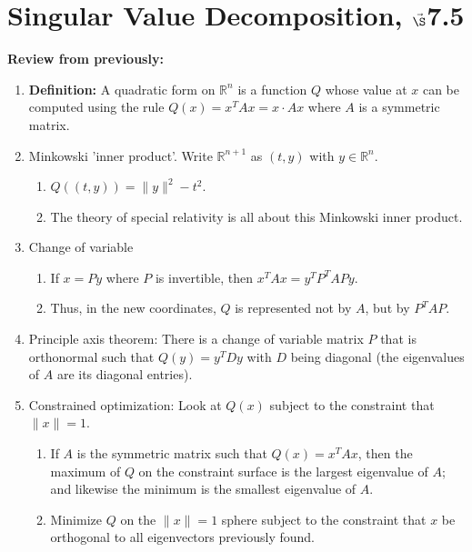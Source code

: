 

%

\section{{Singular Value Decomposition, $\vec\S$7.5}}


%
\thispagestyle{fancy}

\textbf{Review from previously:}
    \begin{enumerate}
    \setlength{\itemsep}{3em}
        \item \textbf{Definition:} A quadratic form on $\mathbb{R}^n$ is a function $Q$ whose value at $x$ can be computed using the rule $Q(x) = x^T A x = x \cdot A x$ where $A$ is a symmetric matrix.
        \item Minkowski 'inner product'. Write $\mathbb{R}^{n+1}$ as $(t, y)$ with $y \in \mathbb{R}^n$.
        \begin{enumerate}
            \item $Q((t, y)) = \|y\|^2 - t^2$.
            \item The theory of special relativity is all about this Minkowski inner product.
        \end{enumerate}
        \item Change of variable
        \begin{enumerate}
            \item If $x = Py$ where $P$ is invertible, then $x^T A x = y^T P^T A P y$.
            \item Thus, in the new coordinates, $Q$ is represented not by $A$, but by $P^T A P$.
        \end{enumerate}
        \item Principle axis theorem: There is a change of variable matrix $P$ that is orthonormal such that $Q(y) = y^T D y$ with $D$ being diagonal (the eigenvalues of $A$ are its diagonal entries).
        \item Constrained optimization: Look at $Q(x)$ subject to the constraint that $\|x\| = 1$.
        \begin{enumerate}
            \item If $A$ is the symmetric matrix such that $Q(x) = x^T A x$, then the maximum of $Q$ on the constraint surface is the largest eigenvalue of $A$; and likewise the minimum is the smallest eigenvalue of $A$.
            \item Minimize $Q$ on the $\|x\| = 1$ sphere subject to the constraint that $x$ be orthogonal to all eigenvectors previously found.
        \end{enumerate}
       \end{enumerate}
\newpage

